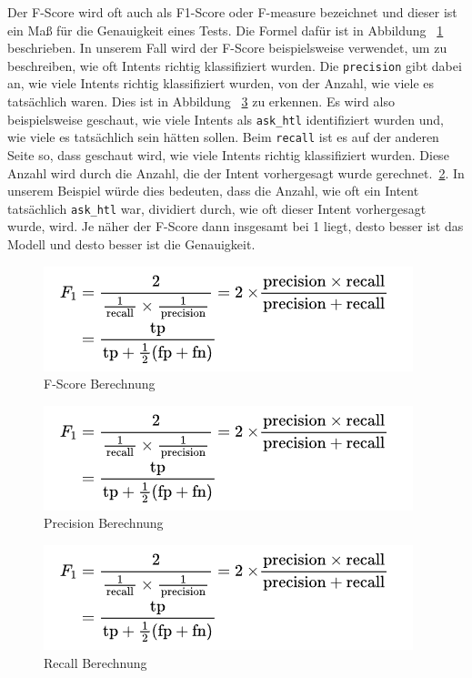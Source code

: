 Der F-Score wird oft auch als F1-Score oder F-measure bezeichnet und dieser ist ein Maß für die Genauigkeit eines Tests.
Die Formel dafür ist in Abbildung ~\ref{fig:f-score} beschrieben.
In unserem Fall wird der F-Score beispielsweise verwendet, um zu beschreiben, wie oft Intents richtig klassifiziert wurden.
Die \texttt{precision} gibt dabei an, wie viele Intents richtig klassifiziert wurden, von der Anzahl, wie viele es tatsächlich waren.
Dies ist in Abbildung ~\ref{fig:precision} zu erkennen.
Es wird also beispielsweise geschaut, wie viele Intents als \texttt{ask\_htl} identifiziert wurden und, wie viele es tatsächlich sein hätten sollen.
Beim \texttt{recall} ist es auf der anderen Seite so, dass geschaut wird, wie viele Intents richtig klassifiziert wurden.
Diese Anzahl wird durch die Anzahl, die der Intent vorhergesagt wurde gerechnet.~\ref{fig:recall}.
In unserem Beispiel würde dies bedeuten, dass die Anzahl, wie oft ein Intent tatsächlich \texttt{ask\_htl} war, dividiert durch, wie oft dieser Intent vorhergesagt wurde, wird.
Je näher der F-Score dann insgesamt bei 1 liegt, desto besser ist das Modell und desto besser ist die Genauigkeit.\cite{fScore}

\begin{figure}[hbt!]
    \centering
    \includegraphics[scale=0.75]{pics/f-score}
    \caption{F-Score Berechnung~\cite{fScore}}
    \label{fig:f-score}
\end{figure}

\begin{figure}[hbt!]
    \centering
    \includegraphics[scale=0.75]{pics/f-score}
    \caption{Precision Berechnung~\cite{precisionRecall}}
    \label{fig:recall}
\end{figure}

\begin{figure}[hbt!]
    \centering
    \includegraphics[scale=0.75]{pics/f-score}
    \caption{Recall Berechnung~\cite{precisionRecall}}
    \label{fig:precision}
\end{figure}

